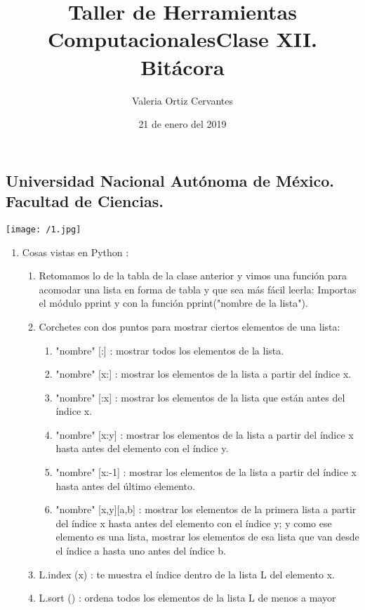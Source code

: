 \documentclass{article} %
\title{\Huge Taller de Herramientas Computacionales}
\author{\huge Valeria Ortiz Cervantes}
\date{\LARGE 21 de enero del 2019}
\begin{document}
\maketitle
\begin{center}
	\subsection*{\LARGE Universidad Nacional Autónoma de México.\\Facultad de Ciencias.\\}
	\texttt{[image: /1.jpg]}
\end{center}
\newpage
\title{\LARGE Clase XII. Bitácora\\}
\begin{enumerate}
	\item Cosas vistas en Python :
	\begin{enumerate}
		\item Retomamos lo de la tabla de la clase anterior y vimos una función para acomodar una lista en forma de tabla y que sea más fácil leerla:  Importas el módulo pprint y con la función pprint("nombre de la lista").
		\item Corchetes con dos puntos para mostrar ciertos elementos de una lista:
		\begin{enumerate}
			\item "nombre" [:] : mostrar todos los elementos de la lista.
			\item "nombre" [x:] : mostrar los elementos de la lista a partir del índice x.
			\item "nombre" [:x] : mostrar los elementos de la lista que están antes del índice x.
			\item "nombre" [x:y] : mostrar los elementos de la lista a partir del índice x hasta antes del elemento con el índice y.
			\item "nombre" [x:-1] : mostrar los elementos de la lista a partir del índice x hasta antes del último elemento.
			\item "nombre" [x,y][a,b] : mostrar los elementos de la primera lista a partir del índice x hasta antes del elemento con el índice y; y como ese elemento es una lista, mostrar los elementos de esa lista que van desde el índice a hasta uno antes del índice b.
		\end{enumerate}
		\item L.index (x) : te muestra el índice dentro de la lista L del elemento x.
		\item L.sort () : ordena todos los elementos de la lista L de menos a mayor

\end{enumerate}
\end{enumerate}
\end{document}
